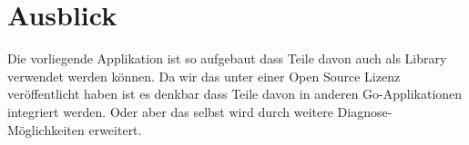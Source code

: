 \section{Ausblick}
Die vorliegende Applikation ist so aufgebaut dass Teile davon auch als Library verwendet werden können. Da wir das \tool unter einer Open Source Lizenz veröffentlicht haben ist es denkbar dass Teile davon in anderen Go-Applikationen integriert werden. Oder aber das \tool selbst wird durch weitere Diagnose-Möglichkeiten erweitert.